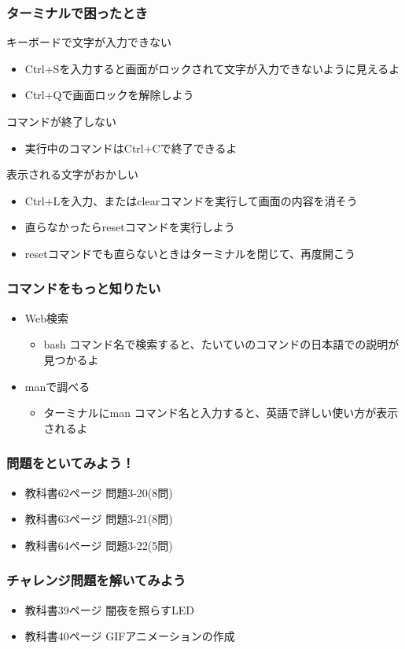 \begin{frame}
    \frametitle{ターミナルで困ったとき}
    キーボードで文字が入力できない
    \begin{itemize}
        \item Ctrl+Sを入力すると画面がロックされて文字が入力できないように見えるよ
        \item Ctrl+Qで画面ロックを解除しよう
    \end{itemize}
    コマンドが終了しない
    \begin{itemize}
        \item 実行中のコマンドはCtrl+Cで終了できるよ
    \end{itemize}
    表示される文字がおかしい
    \begin{itemize}
        \item Ctrl+Lを入力、またはclearコマンドを実行して画面の内容を消そう
        \item 直らなかったらresetコマンドを実行しよう
        \item resetコマンドでも直らないときはターミナルを閉じて、再度開こう
    \end{itemize}
\end{frame}

\begin{frame}
    \frametitle{コマンドをもっと知りたい}
    \begin{itemize}
        \item Web検索
        \begin{itemize}
            \item bash コマンド名で検索すると、たいていのコマンドの日本語での説明が見つかるよ
        \end{itemize}
        \item manで調べる
        \begin{itemize}
            \item ターミナルにman コマンド名と入力すると、英語で詳しい使い方が表示されるよ
        \end{itemize}
    \end{itemize}
\end{frame}

\begin{frame}
    \frametitle{問題をといてみよう！}
    \begin{itemize}
        \item 教科書62ページ 問題3-20(8問)
        \item 教科書63ページ 問題3-21(8問)
        \item 教科書64ページ 問題3-22(5問)
    \end{itemize}
\end{frame}

\begin{frame}
    \frametitle{チャレンジ問題を解いてみよう}
    \begin{itemize}
        \item 教科書39ページ 闇夜を照らすLED
        \item 教科書40ページ GIFアニメーションの作成
    \end{itemize}
\end{frame}